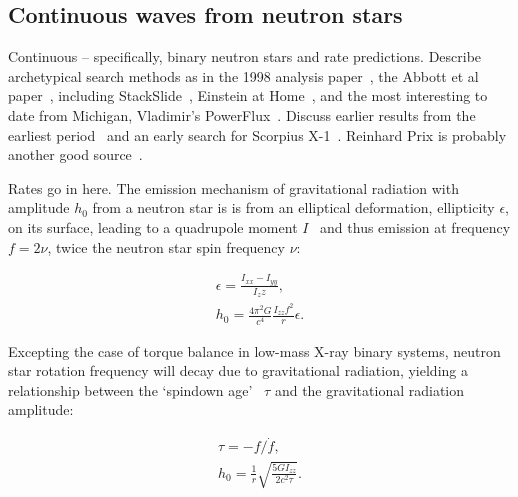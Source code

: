         \subsection{Continuous waves from neutron stars}
        \label{continuous_waves}

            Continuous -- specifically, binary neutron stars and rate predictions. Describe archetypical search methods as in the 1998 analysis paper~\cite{Jaranowski1998}, the Abbott et al paper~\cite{LSCPulsar2006}, including StackSlide~\cite{LSCPulsarS4}, Einstein at Home~\cite{LSCEinsteinHome2009}, and the most interesting to date from Michigan, Vladimir's PowerFlux~\cite{LSCPowerFlux2009}. Discuss earlier results from the earliest period~\cite{Abbott2004} and an early search for Scorpius X-1~\cite{AbbottPulsar2006}. Reinhard Prix is probably another good source~\cite{Prix2006}.

		Rates go in here.
        The emission mechanism of gravitational radiation with amplitude $h_0$ from a neutron star is is from an elliptical deformation, ellipticity $\epsilon$, on its surface, leading to a quadrupole moment $I$~\cite{Zimmermann1979,LSCPulsar2006} and thus emission at frequency $f = 2\nu$, twice the neutron star spin frequency $\nu$:

        \begin{eqnarray}
        \epsilon = \frac{I_{xx} - I_{yy}}{I_zz}, \\
        h_0 = \frac{4 \pi^2 G}{c^4} \frac{I_{zz} f^2}{r} \epsilon.
        \end{eqnarray}

Excepting the case of torque balance in low-mass X-ray binary systems, neutron star rotation frequency will decay due to gravitational radiation, yielding a relationship between the `spindown age'~\cite{Brady1998} $\tau$ and the gravitational radiation amplitude:

        \begin{eqnarray}
        \tau = -f / \dot{f}, \\
        h_0 = \frac{1}{r} \sqrt{\frac{5 G I_{zz}}{2 c^2 \tau}}.
        \end{eqnarray}

